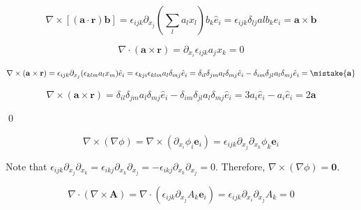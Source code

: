 \documentclass[12pt]{article}
\begin{document}
\begin{equation}
    \nabla \times [(\mathbf{a} \cdot \mathbf{r}) \mathbf{b}] = \epsilon_{ijk} \partial_{x_{j}} \left( \sum_{l} a_{l} x_{l} \right) b_{k} \hat{e}_{i} = \epsilon_{ijk} \delta_{lj} al b_{k} \hat{e}_{i} = \mathbf{a} \times \mathbf{b}
\end{equation}


\begin{equation}
    \nabla \cdot (\mathbf{a} \times \mathbf{r}) = \partial_{x_{i}} \epsilon_{ijk} a_{j} x_{k} = 0
\end{equation}

\begin{equation}
    \nabla \times (\mathbf{a} \times \mathbf{r}) = \epsilon_{ijk} \partial_{x_{j}} (\epsilon_{klm} a_{l} x_{m}) \hat{e}_{i} = \epsilon_{kji} \epsilon_{klm} a_{l} \delta_{mj} \hat{e}_{i} = \delta_{il} \delta_{jm} a_{l} \delta_{mj} \hat{e}_{i}  - \delta_{im} \delta_{jl} a_{l} \delta_{mj} \hat{e}_{i} = \mistake{\mathbf{a}}
\end{equation}

\begin{correction}
    \begin{equation}
        \nabla \times (\mathbf{a} \times \mathbf{r}) = \delta_{il} \delta_{jm} a_{l} \delta_{mj} \hat{e}_{i}  - \delta_{im} \delta_{jl} a_{l} \delta_{mj} \hat{e}_{i} = 3 a_{i} \hat{e}_{i} - a_{i} \hat{e}_{i} = 2 \mathbf{a}
    \end{equation}
\end{correction}
\qed


\begin{equation}
    \nabla \times (\nabla \phi) = \nabla \times (\partial_{x_{i}} \phi_{i} \mathbf{e}_{i}) = \epsilon_{ijk} \partial_{x_{j}} \partial_{x_{k}} \phi_{k} \mathbf{e}_{i}
\end{equation}

Note that $\epsilon_{ijk} \partial_{x_{j}} \partial_{x_{k}} = \epsilon_{ikj} \partial_{x_{k}} \partial_{x_{j}} = - \epsilon_{ikj} \partial_{x_{k}} \partial_{x_{j}} = 0$. Therefore, $\nabla \times (\nabla \phi) = \mathbf{0}$.

\begin{equation}
    \nabla \cdot (\nabla \times \mathbf{A}) = \nabla \cdot (\epsilon_{ijk} \partial_{x_{j}} A_{k} \mathbf{e}_{i}) = \epsilon_{ijk} \partial_{x_{i}} \partial_{x_{j}} A_{k} = 0
\end{equation}
\end{document}
